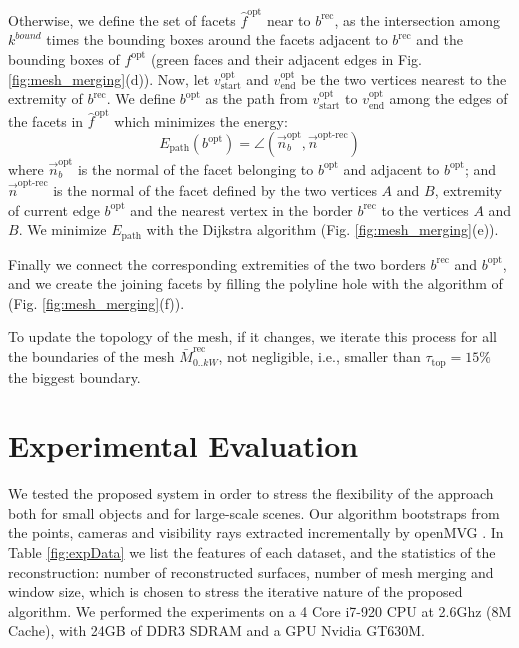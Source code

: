 Otherwise, we define the set of facets $\hat{f}^{\text{opt}}$ near to $\mathit{b}^{\text{rec}}$, as the intersection among  $k^{bound}$ times the bounding boxes around the facets adjacent to  $\mathit{b}^{\text{rec}}$ and the bounding boxes of $f^{\text{opt}}$  (green faces and their adjacent edges in Fig. \ref{fig:mesh_merging}(d)).
Now, let  $v_{\text{start}}^{\text{opt}}$ and $v_{\text{end}}^{\text{opt}}$ be the two vertices nearest to the extremity of  $\mathit{b}^{\text{rec}}$. 
We define $\mathit{b}^{\text{opt}}$ as the path from $v_{\text{start}}^{\text{opt}}$ to $v_{\text{end}}^{\text{opt}}$ among the edges of the facets in $\hat{f}^{\text{opt}}$ which minimizes the energy:
\begin{equation}
  E_{\text{path}}(b^{\text{opt}}) = \angle (\overrightarrow{n}_b^{\text{opt}},\overrightarrow{n}^{\text{opt-rec}})
\end{equation}
where $\overrightarrow{n}_b^{\text{opt}}$ is the normal of the facet belonging to $\mathit{b}^{\text{opt}}$ and adjacent to  $b^{\text{opt}}$; and
$\overrightarrow{n}^{\text{opt-rec}}$ is the normal of the facet defined by the two vertices $A$ and $B$, extremity of current edge ${b}^{\text{opt}}$ and the nearest vertex in the border $\mathit{b}^{\text{rec}}$ to the vertices $A$ and $B$.
We minimize $E_{\text{path}}$ with the Dijkstra algorithm  (Fig. \ref{fig:mesh_merging}(e)).

Finally we connect the corresponding extremities of the two borders $\mathit{b}^{\text{rec}}$ and $\mathit{b}^{\text{opt}}$, and we create the joining facets by filling the polyline hole with the algorithm of \cite{liepa2003filling}  (Fig. \ref{fig:mesh_merging}(f)).

To update the topology of the mesh, if it changes, we iterate this process for all the boundaries of the mesh  $\mathit{\bar{M}}_{0..kW}^{\text{rec}}$, not negligible, i.e., smaller than $\tau_{\text{top}}= 15\%$ the biggest boundary.



\section{Experimental Evaluation}
\label{sec:exp}
We tested the proposed system in order to stress the flexibility of the approach both for small objects and for large-scale scenes. 
Our algorithm bootstraps from the points, cameras and visibility rays extracted incrementally by openMVG \cite{openMVG}. In Table \ref{fig:expData} we list the features of each dataset, and the statistics of the reconstruction: number of reconstructed surfaces, number of mesh merging and window size, which is chosen to stress the iterative nature of the proposed algorithm.
We performed the experiments on a 4 Core i7-920 CPU at 2.6Ghz (8M Cache), with 24GB of DDR3 SDRAM and a GPU Nvidia GT630M.


